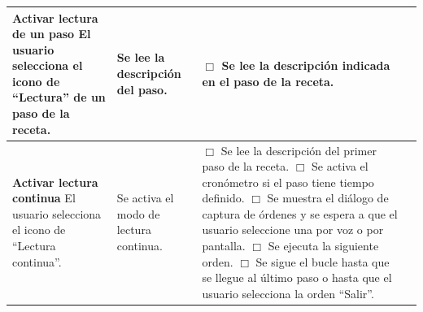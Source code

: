 \begin{center}
\begin{longtable}{|p{3.75cm}|p{3.5cm}|p{5.25cm}|p{1.5cm}|}
    \textbf{Activar lectura de un paso}\newline
    El usuario selecciona el icono de ``Lectura'' de un paso de la receta. &
    Se lee la descripción del paso. &
    $\Box$ Se lee la descripción indicada en el paso de la receta.
    & \\ \hline
    
    \textbf{Activar lectura continua}\newline
    El usuario selecciona el icono de ``Lectura continua''. &
    Se activa el modo de lectura continua. &
    $\Box$ Se lee la descripción del primer paso de la receta.\newline
    $\Box$ Se activa el cronómetro si el paso tiene tiempo definido.\newline
    $\Box$ Se muestra el diálogo de captura de órdenes y se espera a que el
    usuario seleccione una por voz o por pantalla.\newline
    $\Box$ Se ejecuta la siguiente orden.\newline
    $\Box$ Se sigue el bucle hasta que se llegue al último paso o hasta que el
    usuario selecciona la orden ``Salir''.\newline
    & \\ \hline
    
  \end{longtable}
\end{center}



